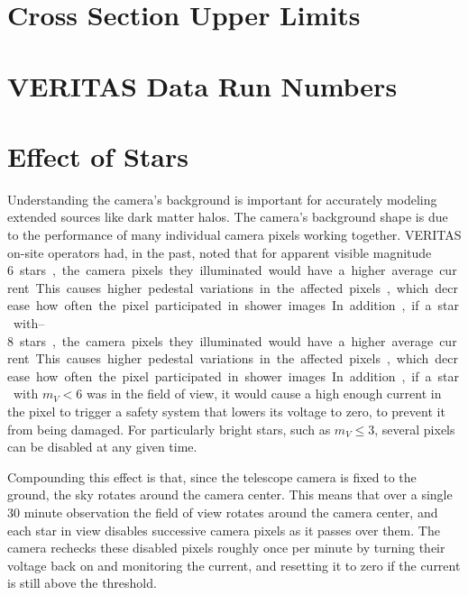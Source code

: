 \cleartooddpage[\thispagestyle{empty}]
\renewcommand{\thechapter}{\thechapter}
\renewcommand{\thesection}{\thechapter.\arabic{section}}
\renewcommand{\thesubsection}{\thechapter.\arabic{section}.\arabic{subsection}}
\renewcommand{\thesubsubsection}{\thechapter.\arabic{section}.\arabic{subsection}.\arabic{subsubsection}}
\renewcommand{\thefigure}{\thechapter.\arabic{figure}}
\renewcommand{\thetable}{\thechapter.\arabic{table}}
\renewcommand{\theequation}{\thechapter.\arabic{equation}}
\appendix

\chapter{Cross Section Upper Limits}



\chapter{VERITAS Data Run Numbers}\label{app:runlists}



\chapter{Effect of Stars}\label{app:starpixels}

  Understanding the camera's background is important for accurately modeling extended sources like dark matter halos.
  The camera's background shape is due to the performance of many individual camera pixels working together.
  VERITAS on-site operators had, in the past, noted that for apparent visible magnitude \SIrange{6}{8} stars, the camera pixels they illuminated would have a higher average current.
  This causes higher pedestal variations in the affected pixels, which decrease how often the pixel participated in shower images.
  In addition, if a star with $m_V < 6$ was in the field of view, it would cause a high enough current in the pixel to trigger a safety system that lowers its voltage to zero, to prevent it from being damaged.
  For particularly bright stars, such as $m_V \leq 3$, several pixels can be disabled at any given time.

  Compounding this effect is that, since the telescope camera is fixed to the ground, the sky rotates around the camera center.
  This means that over a single 30 minute observation the field of view rotates around the camera center, and each star in view disables successive camera pixels as it passes over them.
  The camera rechecks these disabled pixels roughly once per minute by turning their voltage back on and monitoring the current, and resetting it to zero if the current is still above the threshold.


